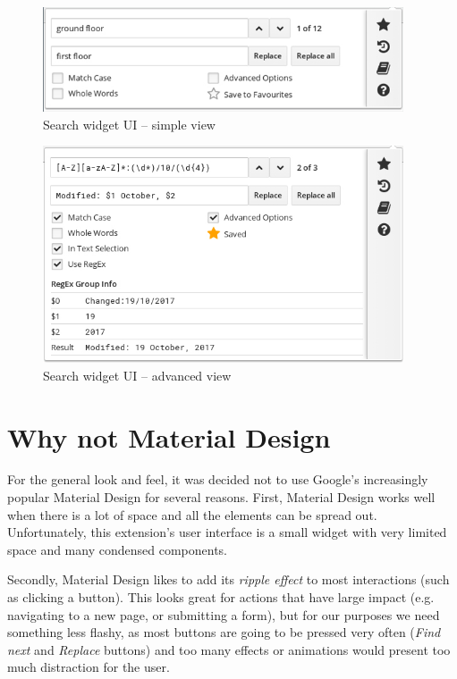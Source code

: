 \documentclass[bsc,frontabs,twoside,singlespacing,parskip,deptreport]{infthesis}
\begin{document}
\begin{figure}[h]
\centering
\includegraphics[width=0.95\textwidth]{../graphics/search-widget-simple.png}
\caption{Search widget UI -- simple view}
\end{figure}

\begin{figure}[h]
\centering
\includegraphics[width=0.95\textwidth]{../graphics/search-widget-advanced.png}
\caption{Search widget UI -- advanced view}
\end{figure}

\section{Why not Material Design}
For the general look and feel, it was decided not to use Google's increasingly popular Material Design \cite{A2} for several reasons. First, Material Design works well when there is a lot of space and all the elements can be spread out. Unfortunately, this extension's user interface is a small widget with very limited space and many condensed components.

Secondly, Material Design likes to add its \textit{ripple effect} to most interactions (such as clicking a button). This looks great for actions that have large impact (e.g. navigating to a new page, or submitting a form), but for our purposes we need something less flashy, as most buttons are going to be pressed very often (\textit{Find next} and \textit{Replace} buttons) and too many effects or animations would present too much distraction for the user.
\end{document}
